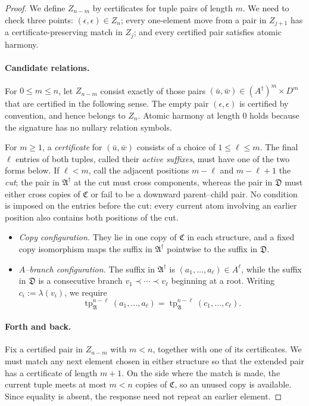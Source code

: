 \documentclass{lmcs}
\newcommand{\tp}{\operatorname{tp}}
\newcommand{\A}{\mathfrak{A}}
\newcommand{\C}{\mathfrak{C}}
\newcommand{\D}{\mathfrak{D}}
\begin{document}
\begin{proof}
We define $Z_{n-m}$ by certificates for tuple pairs of length $m$.  We need
to check three points: $(\epsilon,\epsilon)\in Z_n$; every one-element move
from a pair in $Z_{j+1}$ has a certificate-preserving match in $Z_j$; and
every certified pair satisfies atomic harmony.

\paragraph{Candidate relations.}
For $0\leq m\leq n$, let $Z_{n-m}$ consist exactly of those pairs
$(\bar u,\bar w)\in(A^{\dagger})^m\times D^m$ that are certified in the
following sense.  The empty pair $(\epsilon,\epsilon)$ is certified by
convention, and hence belongs to $Z_n$.  Atomic harmony at length $0$ holds
because the signature has no nullary relation symbols.

For $m\geq1$, a \emph{certificate} for $(\bar u,\bar w)$ consists of a choice
of $1\leq\ell\leq m$.  The final $\ell$ entries of both tuples, called their
\emph{active suffixes}, must have one of the two forms below.  If $\ell<m$,
call the adjacent positions $m-\ell$ and $m-\ell+1$ the \emph{cut}; the pair
in $\A^{\dagger}$ at the cut must cross components, whereas the pair in $\D$
must either cross copies of $\C$ or fail to be a downward parent--child pair.
No condition is imposed on the entries before the cut: every current atom
involving an earlier position also contains both positions of the cut.
\begin{itemize}
  \item \emph{Copy configuration.}  They lie in one copy of $\C$ in each
  structure, and a fixed copy isomorphism maps the suffix in $\A^{\dagger}$
  pointwise to the suffix in $\D$.
  \item \emph{$A$--branch configuration.}  The suffix in $\A^{\dagger}$ is
  $(a_1,\ldots,a_\ell)\in A^\ell$, while the suffix in $\D$ is a consecutive
  branch $v_1\prec\cdots\prec v_\ell$ beginning at a root.  Writing
  $c_i:=\lambda(v_i)$, we require
  \begin{equation}
     \tp_{\A}^{n-\ell}(a_1,\ldots,a_\ell)
     =
     \tp_{\A}^{n-\ell}(c_1,\ldots,c_\ell).
     \label{eq:reset-invariant}
  \end{equation}
\end{itemize}

\paragraph{Forth and back.}
Fix a certified pair in $Z_{n-m}$ with $m<n$, together with one of its
certificates.  We must match any next element
chosen in either structure so that the extended pair has a certificate of
length $m+1$.  On the side where the match is made, the current tuple meets at
most $m<n$ copies of $\C$, so an unused copy is available.  Since equality is
absent, the response need not repeat an earlier element.


\end{proof}
\end{document}
